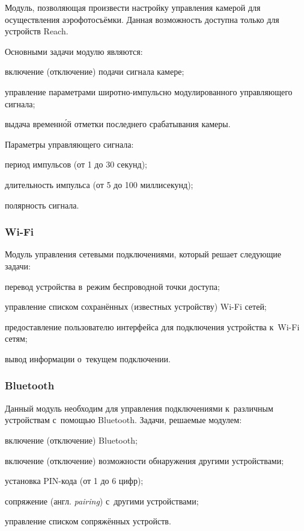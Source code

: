 Модуль, позволяющая произвести настройку управления камерой для осуществления аэрофотосъёмки. Данная возможность доступна только для устройств Reach.

Основными задачи модулю являются:
\begin{dashitemize}
  \item включение (отключение) подачи сигнала камере;
  \item управление параметрами широтно-импульсно модулированного управляющего сигнала;
  \item выдача временн\'ой отметки последнего срабатывания камеры.
\end{dashitemize}

Параметры управляющего сигнала:
\begin{dashitemize}
  \item период импульсов (от 1 до 30 секунд);
  \item длительность импульса (от 5 до 100 миллисекунд);
  \item полярность сигнала.
\end{dashitemize}


\subsubsection{Wi-Fi}

Модуль управления сетевыми подключениями, который решает следующие задачи:
\begin{dashitemize}
  \item перевод устройства в~режим беспроводной точки доступа;
  \item управление списком сохранённых (известных устройству) Wi-Fi сетей;
  \item предоставление пользователю интерфейса для подключения устройства к~Wi-Fi сетям;
  \item вывод информации о~текущем подключении.
\end{dashitemize}


\subsubsection{Bluetooth}

Данный модуль необходим для управления подключениями к~различным устройствам с~помощью Bluetooth. Задачи, решаемые модулем:
\begin{dashitemize}
  \item включение (отключение) Bluetooth;
  \item включение (отключение) возможности обнаружения другими устройствами;
  \item установка PIN-кода (от 1 до 6 цифр);
  \item сопряжение (англ. \emph{pairing}) с~другими устройствами;
  \item управление списком сопряжённых устройств.
\end{dashitemize}


